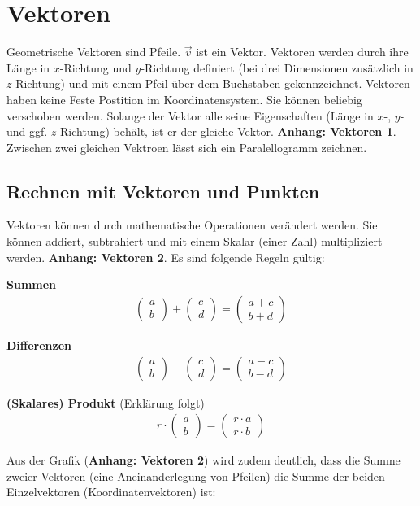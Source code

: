 \documentclass{article}
\newcommand{\m}[1]{\begin{pmatrix}#1\end{pmatrix}}
\begin{document}
    \section{Vektoren}

    Geometrische Vektoren sind Pfeile. $\vec{v}$ ist ein Vektor.
    Vektoren werden durch ihre Länge in $x$-Richtung und $y$-Richtung definiert
    (bei drei Dimensionen zusätzlich in $z$-Richtung) und mit einem Pfeil über dem Buchstaben gekennzeichnet.
    Vektoren haben keine Feste Postition im Koordinatensystem. Sie können beliebig verschoben werden.
    Solange der Vektor alle seine Eigenschaften (Länge in $x$-, $y$- und ggf. $z$-Richtung) behält,
    ist er der gleiche Vektor. \textbf{Anhang: Vektoren 1}. Zwischen zwei gleichen Vektroen lässt sich ein
    Paralellogramm zeichnen.
    

    \subsection{Rechnen mit Vektoren und Punkten}
    Vektoren können durch mathematische Operationen verändert werden. 
    Sie können addiert, subtrahiert und mit einem Skalar (einer Zahl) multipliziert werden.
    \textbf{Anhang: Vektoren 2}.
    Es sind folgende Regeln gültig:


    \textbf{Summen}
    \[
        \begin{split}
            \m{a \\ b} + \m{c \\ d} = \m{a+c \\ b+d}
        \end{split}
    \]

    \textbf{Differenzen}
    \[
        \begin{split}
            \m{a \\ b} - \m{c \\ d} = \m{a-c \\ b-d}
        \end{split}
    \]

    \textbf{(Skalares) Produkt} (Erklärung folgt)
    \[
        \begin{split}
            r \cdot \m{a \\ b} = \m{r \cdot a \\ r \cdot b}
        \end{split}
    \]

    Aus der Grafik (\textbf{Anhang: Vektoren 2}) wird zudem deutlich, dass die Summe zweier Vektoren (eine Aneinanderlegung von Pfeilen)
    die Summe der beiden Einzelvektoren (Koordinatenvektoren) ist:
\end{document}
